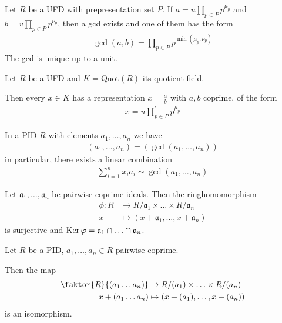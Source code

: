 \begin{prop}[]
  Let $R$ be a UFD with prepresentation set $P$.
  If $a = u \prod_{p \in P}p^{\mu_p}$ and $b = v \prod_{p \in P}p^{\nu_p}$, then a gcd exists and one of them has the form
  \begin{align*}
    \gcd(a,b) = \prod_{p \in P}p^{\min(\mu_p,\nu_p)}
  \end{align*}
  The gcd is unique up to a unit.
\end{prop}


\begin{cor}
  Let $R$ be a UFD and $K = \text{Quot}(R)$ its quotient field. 

  Then every $x \in K$ has a representation $x = \frac{a}{b}$ with $a,b$ coprime.
  of the form
  \begin{align*}
    x = u \prod_{p \in P}^{\prime} p^{\mu_p}
  \end{align*}
\end{cor}

\begin{prop}[]
In a PID $R$ with elements $a_{1}, \ldots, a_{n}$ we have
\begin{align*}
  (a_{1}, \ldots, a_{n}) = \left(
    \gcd(a_{1}, \ldots, a_{n})
  \right)
\end{align*}
in particular, there exists a linear combination
\begin{align*}
  \sum_{i=1}^{n}x_ia_i \sim \gcd(a_{1}, \ldots, a_{n})
\end{align*}
\end{prop}


\begin{thm}
Let $\mathfrak{a}_1,\ldots,\mathfrak{a}_n$ be pairwise coprime ideals. 
Then the ringhomomorphism
\begin{align*}
  \phi: R &\to  R/\mathfrak{a}_1 \times \ldots \times R/\mathfrak{a}_n\\
  x &\mapsto (x + \mathfrak{a}_1,\ldots,x+ \mathfrak{a}_n)
\end{align*}
is surjective and $\operatorname{Ker} \varphi = \mathfrak{a}_1 \cap \ldots \cap \mathfrak{a}_n$.
\end{thm}


\begin{cor}
  Let $R$ be a PID, $a_{1}, \ldots, a_{n} \in R$ pairwise coprime.

  Then the map
  \begin{align*}
    \faktor{R}{(a_1 \dots a_n)} &\to R/(a_1) \times \ldots \times R/(a_n)\\
    x + (a_1 \dots a_n) &\mapsto (x + (a_1),\ldots,x + (a_n))
  \end{align*}
  is an isomorphism.
\end{cor}




